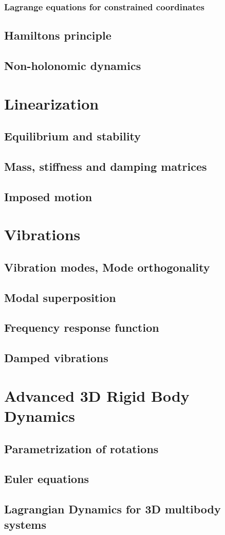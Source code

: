 \documentclass[10pt,a4paper]{scrartcl}
\begin{document}
\begin{multicols*}{2}

\subsubsection{Lagrange equations for constrained coordinates}
\subsection{Hamiltons principle}
\subsection{Non-holonomic dynamics}
\section{Linearization}
\subsection{Equilibrium and stability}
\subsection{Mass, stiffness and damping matrices}
\subsection{Imposed motion}
\section{Vibrations}
\subsection{Vibration modes, Mode orthogonality}
\subsection{Modal superposition}
\subsection{Frequency response function}
\subsection{Damped vibrations}
\section{Advanced 3D Rigid Body Dynamics}
\subsection{Parametrization of rotations}
\subsection{Euler equations}
\subsection{Lagrangian Dynamics for 3D multibody systems}
\end{multicols*}
\end{document}
